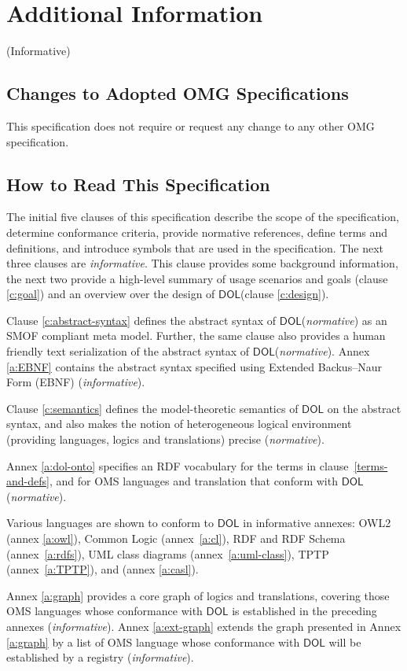 \documentclass[10pt,fleqn,final]{scrreprt}
\newcommand*{\DOL}{\ensuremath{\mathsf{DOL}}\xspace}
\newcommand{\informative}[0]{{\begin{center}{\Large{(Informative})}\end{center}} \bigskip}
\newcommand{\clauseI}[1]{\chapter{#1} \informative }
\newenvironment{definitions}[0]{\medskip }{}
\begin{document}
\begin{definitions}
\clauseI{Additional Information}

\section{Changes to Adopted OMG Specifications}
This specification does not require or request any change to any other OMG specification. 

\section{How to Read This Specification}

The initial five clauses of this specification describe the scope of the specification, determine conformance criteria, provide normative references, define terms and definitions, and introduce symbols that are used in the specification. 
The next three clauses are \emph{informative}. This clause provides some background information, the next two provide a high-level
 summary of usage scenarios and goals (clause \ref{c:goal}) and an overview over the design of
\DOL  (clause \ref{c:design}).


\medskip \noindent 

Clause \ref{c:abstract-syntax} defines the abstract syntax of \DOL (\emph{normative}) as an SMOF compliant meta model.
Further,  the same clause also provides a human friendly text serialization of the abstract syntax of 
\DOL (\emph{normative}). 
Annex \ref{a:EBNF} contains the abstract syntax specified using Extended
Backus–Naur Form (EBNF) 
(\emph{informative}).

\medskip \noindent Clause \ref{c:semantics} defines the
model-theoretic semantics of \DOL on the abstract syntax, and also
makes the notion of heterogeneous logical environment (providing
languages, logics and translations) precise (\emph{normative}).

\medskip \noindent Annex \ref{a:dol-onto} specifies an RDF vocabulary for
the terms in clause~\ref{terms-and-defs}, and for OMS languages and
translation that conform with \DOL  (\emph{normative}).

\medskip \noindent Various languages are shown to  conform to \DOL in
informative annexes: OWL2 (annex \ref{a:owl}), Common Logic
(annex~\ref{a:cl}), RDF and RDF Schema (annex~\ref{a:rdfs}), UML class
diagrams (annex~\ref{a:uml-class}), TPTP (annex~\ref{a:TPTP}), and
\CASL (annex \ref{a:casl}).

\medskip \noindent 
Annex \ref{a:graph}  provides a core graph of logics and translations, covering those OMS languages
whose conformance with \DOL is established in the preceding annexes (\emph{informative}). 
Annex \ref{a:ext-graph} extends the graph presented in Annex \ref{a:graph}  by a list of OMS
language whose conformance with \DOL will be established by a registry
(\emph{informative}).


\end{definitions}
\end{document}

